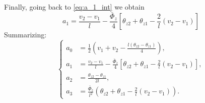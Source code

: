 \documentclass[a4paper,11pt]{article}
\begin{document}
Finally, going back to \eqref{eq:a_1_int} we obtain
\begin{equation}
a_1 = \frac{v_2 - v_1}{l} - \frac{\bar{\Phi}_z}{4} \left[ \theta_{z2} + \theta_{z1} -\frac{2}{l}(v_2-v_1) \right]
\end{equation}
Summarizing:
\begin{equation}
\left\{
	\begin{aligned}
		a_0 & = \frac{1}{2} \left( v_1 + v_2 - \frac{l(\theta_{z2} - \theta_{z1})}{4} \right), \\
		a_1 & = \frac{v_2 - v_1}{l} - \frac{\bar{\Phi}_z}{4} \left[ \theta_{z2} + \theta_{z1} -\frac{2}{l}(v_2-v_1) \right], \\
		a_2 & = \frac{\theta_{z2} - \theta_{z1}}{2l}, \\
		a_3 & = \frac{\bar{\Phi}_z}{l^2} \left( \theta_{z2} + \theta_{z1} -\frac{2}{l}(v_2-v_1) \right).
	\end{aligned}
\right.
\end{equation}
\end{document}
